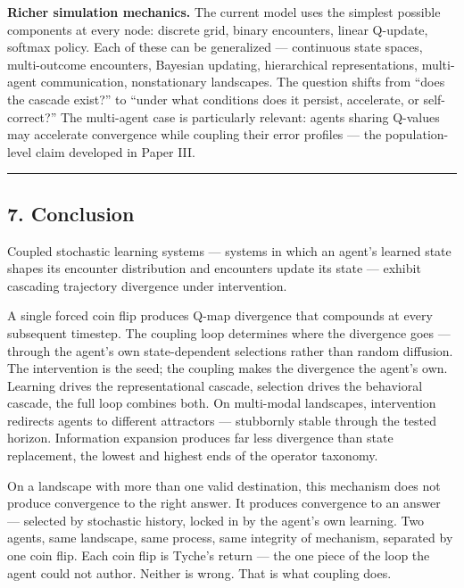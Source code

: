 \documentclass[
]{article}
\begin{document}
\textbf{Richer simulation mechanics.} The current model uses the
simplest possible components at every node: discrete grid, binary
encounters, linear Q-update, softmax policy. Each of these can be
generalized --- continuous state spaces, multi-outcome encounters,
Bayesian updating, hierarchical representations, multi-agent
communication, nonstationary landscapes. The question shifts from ``does
the cascade exist?'' to ``under what conditions does it persist,
accelerate, or self-correct?'' The multi-agent case is particularly
relevant: agents sharing Q-values may accelerate convergence while
coupling their error profiles --- the population-level claim developed
in Paper III.

\begin{center}\rule{0.5\linewidth}{0.5pt}\end{center}

\subsection{7. Conclusion}\label{conclusion}

Coupled stochastic learning systems --- systems in which an agent's
learned state shapes its encounter distribution and encounters update
its state --- exhibit cascading trajectory divergence under
intervention.

A single forced coin flip produces Q-map divergence that compounds at
every subsequent timestep. The coupling loop determines where the
divergence goes --- through the agent's own state-dependent selections
rather than random diffusion. The intervention is the seed; the coupling
makes the divergence the agent's own. Learning drives the
representational cascade, selection drives the behavioral cascade, the
full loop combines both. On multi-modal landscapes, intervention
redirects agents to different attractors --- stubbornly stable through
the tested horizon. Information expansion produces far less divergence
than state replacement, the lowest and highest ends of the operator
taxonomy.

On a landscape with more than one valid destination, this mechanism does
not produce convergence to the right answer. It produces convergence to
an answer --- selected by stochastic history, locked in by the agent's
own learning. Two agents, same landscape, same process, same integrity
of mechanism, separated by one coin flip. Each coin flip is Tyche's
return --- the one piece of the loop the agent could not author. Neither
is wrong. That is what coupling does.
\end{document}
